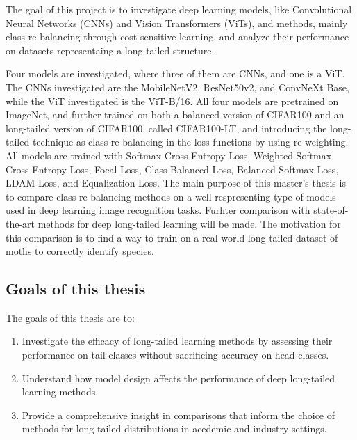 The goal of this project is to investigate deep learning models, like Convolutional Neural Networks (CNNs) and Vision Transformers (ViTs), and methods, mainly class re-balancing through cost-sensitive learning, and analyze their performance on datasets representaing a long-tailed structure.  

Four models are investigated, where three of them are CNNs, and one is a ViT. The CNNs investigated are the MobileNetV2, ResNet50v2, and ConvNeXt Base, while the ViT investigated is the ViT-B/16. All four models are pretrained on ImageNet, and further trained on both a balanced version of CIFAR100 and an long-tailed version of CIFAR100, called CIFAR100-LT, and introducing the long-tailed technique as class re-balancing in the loss functions by using re-weighting. All models are trained with Softmax Cross-Entropy Loss, Weighted Softmax Cross-Entropy Loss, Focal Loss, Class-Balanced Loss, Balanced Softmax Loss, LDAM Loss, and Equalization Loss. The main purpose of this master's thesis is to compare class re-balancing methods on a well respresenting type of models used in deep learning image recognition tasks. Furhter comparison with state-of-the-art methods for deep long-tailed learning will be made. The motivation for this comparison is to find a way to train on a real-world long-tailed dataset of moths to correctly identify species.




\subsection{Goals of this thesis}
The goals of this thesis are to:

\begin{enumerate}
    \item Investigate the efficacy of long-tailed learning methods by assessing their performance on tail classes without sacrificing accuracy on head classes. 
    \item Understand how model design affects the performance of deep long-tailed learning methods.
    \item Provide a comprehensive insight in comparisons that inform the choice of methods for long-tailed distributions in acedemic and industry settings.
\end{enumerate}

